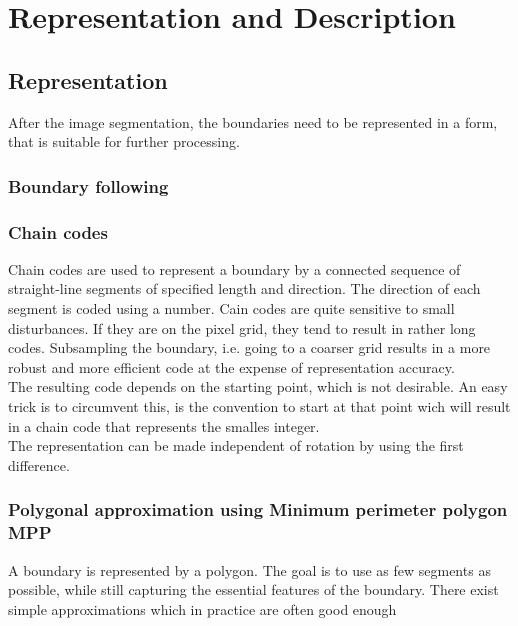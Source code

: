\section{Representation and Description}
\label{sec:representationDescription}
\subsection{Representation}
After the image segmentation, the boundaries need to be represented in a form, that is suitable for further processing.
\subsubsection{Boundary following}
\subsubsection{Chain codes}
Chain codes are used to represent a boundary by a connected sequence of straight-line segments of specified length and direction. The direction of each segment is coded using a number.
Cain codes are quite sensitive to small disturbances. If they are on the pixel grid, they tend to result in rather long codes. Subsampling the boundary, i.e. going to a coarser grid results in a more robust and more efficient code at the expense of representation accuracy.\\
The resulting code depends on the starting point, which is not desirable. An easy trick is to circumvent this, is the convention to start at that point wich will result in a chain code that represents the smalles integer.\\
The representation can be made independent of rotation by using the first difference.
\subsubsection{Polygonal approximation using Minimum perimeter polygon MPP}
A boundary is represented by a polygon. The goal is to use as few segments as possible, while still capturing the essential features of the boundary. There exist simple approximations which in practice are often good enough\\
